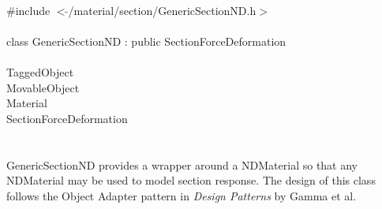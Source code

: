 
   \\
\indent \#include $<\tilde{ }$/material/section/GenericSectionND.h$>$  \\

  \\
\indent class GenericSectionND : public SectionForceDeformation \\

 \\
\indent TaggedObject \\
\indent MovableObject \\
\indent\indent Material \\
\indent\indent\indent SectionForceDeformation \\
\indent\indent\indent{} \\

  \\
\indent GenericSectionND provides a wrapper around a NDMaterial
so that any NDMaterial may be used to model section response. 
The design of this class follows the Object Adapter pattern in 
{\em Design Patterns} by Gamma et al.\\

